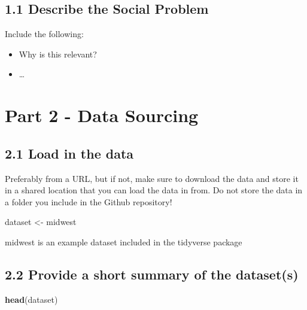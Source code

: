 \documentclass[
]{article}
\newenvironment{Shaded}{\begin{snugshade}}{\end{snugshade}}
\newcommand{\FunctionTok}[1]{\textcolor[rgb]{0.13,0.29,0.53}{\textbf{#1}}}
\newcommand{\NormalTok}[1]{#1}
\newcommand{\OtherTok}[1]{\textcolor[rgb]{0.56,0.35,0.01}{#1}}
\begin{document}
\subsection{1.1 Describe the Social
Problem}\label{describe-the-social-problem}

Include the following:

\begin{itemize}
\item
  Why is this relevant?
\item
  \ldots{}
\end{itemize}

\section{Part 2 - Data Sourcing}\label{part-2---data-sourcing}

\subsection{2.1 Load in the data}\label{load-in-the-data}

Preferably from a URL, but if not, make sure to download the data and
store it in a shared location that you can load the data in from. Do not
store the data in a folder you include in the Github repository!

\begin{Shaded}
\begin{Highlighting}[]
\NormalTok{dataset }\OtherTok{\textless{}{-}}\NormalTok{ midwest}
\end{Highlighting}
\end{Shaded}

midwest is an example dataset included in the tidyverse package

\subsection{2.2 Provide a short summary of the
dataset(s)}\label{provide-a-short-summary-of-the-datasets}

\begin{Shaded}
\begin{Highlighting}[]
\FunctionTok{head}\NormalTok{(dataset)}
\end{Highlighting}
\end{Shaded}
\end{document}
